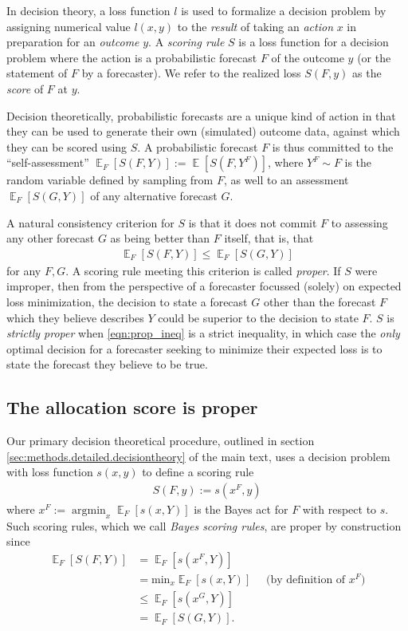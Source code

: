 \documentclass{article}
\DeclareMathOperator*{\argmin}{argmin}
\DeclareMathOperator{\Ex}{\mathbb{E}}
\begin{document}
In decision theory, a loss function $l$ is used to formalize a decision problem by assigning numerical value $l(x,y)$ to the 
\emph{result} of taking an \emph{action} $x$ in preparation for an \emph{outcome} $y$. A \emph{scoring rule} $S$ is a 
loss function for a decision problem where the action is a probabilistic forecast $F$ of the outcome $y$ (or the statement of $F$ by a forecaster). 
We refer to the realized loss $S(F,y)$ as the \emph{score} of $F$ at $y$.

Decision theoretically, probabilistic forecasts are a unique kind of action in that they can be used to generate their
own (simulated) outcome data, against which they can be scored using $S$. A probabilistic forecast
$F$ is thus committed to the ``self-assessment'' $\Ex_F [S(F, Y)] := \Ex [S(F, Y^F)]$, where $Y^F \sim F$ is the random variable defined 
by sampling from $F$, as well to an assessment $\Ex_F [S(G, Y)]$ of any alternative forecast $G$.

A natural consistency criterion for $S$ is that it does not commit $F$ to assessing any other forecast $G$ 
as being better than $F$ itself, that is, that
\begin{align}
\Ex_F [S(F, Y)] \leq \Ex_F [S(G, Y)] \label{eqn:prop_ineq}
\end{align} 
for any $F,G$. A scoring rule meeting this criterion is called \emph{proper}. If $S$ were improper, then from the perspective of 
a forecaster focussed (solely) on expected loss minimization, the decision to state 
a forecast $G$ other than the forecast $F$ which they believe describes $Y$ could be superior to the decision to state $F$. 
$S$ is \emph{strictly proper} when 
\eqref{eqn:prop_ineq} is a strict inequality, in which case the 
\emph{only} optimal decision for a forecaster seeking to minimize their expected loss is to state the forecast they believe to be true.

\subsection{The allocation score is proper}
\label{sec:alloscore_proper}

Our primary decision theoretical procedure, outlined in section \ref{sec:methods.detailed.decisiontheory} of the main text, 
uses a decision problem with loss function $s(x,y)$ to define a scoring rule 
\begin{align}
S(F,y) := s(x^F,y) \label{eqn:bayes_sr}
\end{align}
where $x^F := \argmin_{x} \Ex_F[s(x,Y)]$ is the Bayes act for $F$ with respect to $s$. 
Such scoring rules, which we call \emph{Bayes scoring rules}, 
are proper by construction since
\begin{align}
\Ex_F [S(F, Y)] &= \Ex_F [ s(x^F, Y) ] \nonumber \\
 &= \mathrm{min}_{x} \Ex_F [ s(x, Y) ] \quad \text{ (by definition of $x^F$)} \\
 &\leq \Ex_F [ s(x^G, Y) ] \label{eqn:dt_proper_key} \\
 &= \Ex_F [ S(G, Y)]. \nonumber
\end{align}
\end{document}
